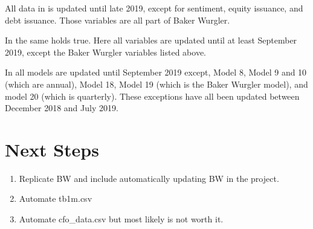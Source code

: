 \documentclass{article}
\begin{document}
	All data in  is updated until late 2019, except for sentiment, equity issuance, and debt issuance. Those variables are all part of Baker Wurgler.  
	
	In  the same holds true. Here all variables are updated until at least September 2019, except the Baker Wurgler variables listed above. 
	
	In  all models are updated until September 2019 except, Model 8, Model 9 and 10 (which are annual), Model 18, Model 19 (which is the Baker Wurgler model), and model 20 (which is quarterly). These exceptions have all been updated between December 2018 and July 2019. 
	
	\section{Next Steps}
	\begin{enumerate}
		\item Replicate BW and include automatically updating BW in the project.
		\item Automate tb1m.csv
		\item Automate cfo\_data.csv but most likely is not worth it. 
	\end{enumerate}
	
\end{document}
